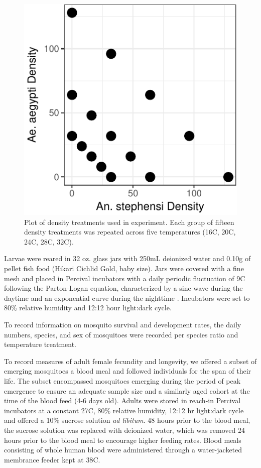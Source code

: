 \documentclass[12pt,]{article}
\begin{document}
\begin{figure}[htbp]
\centering
\includegraphics{manuscript_files/figure-latex/fig1-1.pdf}
\caption{Plot of density treatments used in experiment. Each group of
fifteen density treatments was repeated across five temperatures (16C,
20C, 24C, 28C, 32C).}
\end{figure}

Larvae were reared in 32 oz. glass jars with 250mL deionized water and
0.10g of pellet fish food (Hikari Cichlid Gold, baby size). Jars were
covered with a fine mesh and placed in Percival incubators with a daily
periodic fluctuation of 9C following the Parton-Logan equation,
characterized by a sine wave during the daytime and an exponential curve
during the nighttime \citep{parton1981}. Incubators were set to 80\%
relative humidity and 12:12 hour light:dark cycle.

To record information on mosquito survival and development rates, the
daily numbers, species, and sex of mosquitoes were recorded per species
ratio and temperature treatment.

To record measures of adult female fecundity and longevity, we offered a
subset of emerging mosquitoes a blood meal and followed individuals for
the span of their life. The subset encompassed mosquitoes emerging
during the period of peak emergence to ensure an adequate sample size
and a similarly aged cohort at the time of the blood feed (4-6 days
old). Adults were stored in reach-in Percival incubators at a constant
27C, 80\% relative humidity, 12:12 hr light:dark cycle and offered a
10\% sucrose solution \emph{ad libitum}. 48 hours prior to the blood
meal, the sucrose solution was replaced with deionized water, which was
removed 24 hours prior to the blood meal to encourage higher feeding
rates. Blood meals consisting of whole human blood were administered
through a water-jacketed membrance feeder kept at 38C.
\end{document}
